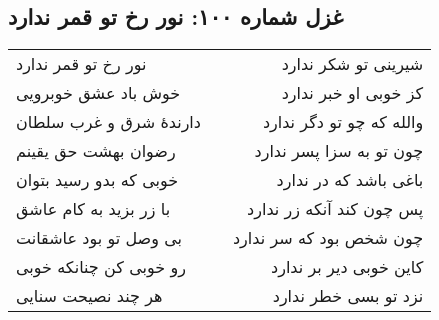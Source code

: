 \begin{center}
\section*{غزل شماره ۱۰۰: نور رخ تو قمر ندارد}
\label{sec:100}
\begin{longtable}{l p{0.5cm} r}
نور رخ تو قمر ندارد
&&
شیرینی تو شکر ندارد
\\
خوش باد عشق خوبرویی
&&
کز خوبی او خبر ندارد
\\
دارندهٔ شرق و غرب سلطان
&&
والله که چو تو دگر ندارد
\\
رضوان بهشت حق یقینم
&&
چون تو به سزا پسر ندارد
\\
خوبی که بدو رسید بتوان
&&
باغی باشد که در ندارد
\\
با زر بزید به کام عاشق
&&
پس چون کند آنکه زر ندارد
\\
بی وصل تو بود عاشقانت
&&
چون شخص بود که سر ندارد
\\
رو خوبی کن چنانکه خوبی
&&
کاین خوبی دیر بر ندارد
\\
هر چند نصیحت سنایی
&&
نزد تو بسی خطر ندارد
\\
\end{longtable}
\end{center}
